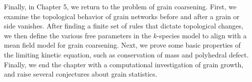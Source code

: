 Finally, in Chapter 5, we return to the problem of grain coarsening. First, we examine the topological behavior of grain networks before and after a grain or side vanishes. After finding a finite set of rules that dictate topological changes,    we then define the various free parameters in the $k$-species model to align with a mean field model for grain coarsening.  Next, we prove some basic properties of the limiting kinetic equation, such as conservation of mass and polyhedral defect.  Finally, we end the chapter with a computational investigation of grain growth, and raise several conjectures about grain statistics.   
  

